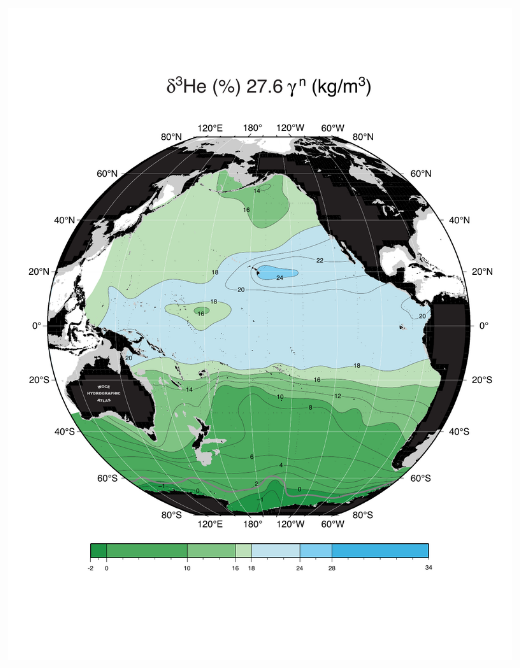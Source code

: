 \documentclass{beamer}
\begin{document}
\begin{frame}[plain,t]
\begin{columns}
\begin{column}{0.33\textwidth}
        \includegraphics[width=\textwidth]{delhe3_isopyc_final_pdf/pac2760_delhe3_final.pdf}
      \end{column}
    \end{columns} 
\end{frame}
\end{document}
